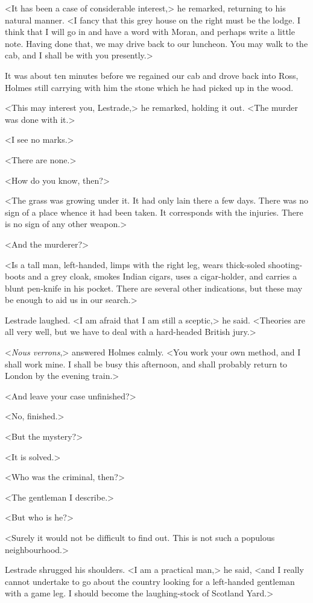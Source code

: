 <It has been a case of considerable interest,> he remarked, returning to his natural manner. <I fancy that this grey house on the right must be the lodge. I think that I will go in and have a word with Moran, and perhaps write a little note. Having done that, we may drive back to our luncheon. You may walk to the cab, and I shall be with you presently.>

It was about ten minutes before we regained our cab and drove back into Ross, Holmes still carrying with him the stone which he had picked up in the wood.

<This may interest you, Lestrade,> he remarked, holding it out. <The murder was done with it.>

<I see no marks.>

<There are none.>

<How do you know, then?>

<The grass was growing under it. It had only lain there a few days. There was no sign of a place whence it had been taken. It corresponds with the injuries. There is no sign of any other weapon.>

<And the murderer?>

<Is a tall man, left-handed, limps with the right leg, wears thick-soled shooting-boots and a grey cloak, smokes Indian cigars, uses a cigar-holder, and carries a blunt pen-knife in his pocket. There are several other indications, but these may be enough to aid us in our search.>

Lestrade laughed. <I am afraid that I am still a sceptic,> he said. <Theories are all very well, but we have to deal with a hard-headed British jury.>

<\textit{Nous verrons},> answered Holmes calmly. <You work your own method, and I shall work mine. I shall be busy this afternoon, and shall probably return to London by the evening train.>

<And leave your case unfinished?>

<No, finished.>

<But the mystery?>

<It is solved.>

<Who was the criminal, then?>

<The gentleman I describe.>

<But who is he?>

<Surely it would not be difficult to find out. This is not such a populous neighbourhood.>

Lestrade shrugged his shoulders. <I am a practical man,> he said, <and I really cannot undertake to go about the country looking for a left-handed gentleman with a game leg. I should become the laughing-stock of Scotland Yard.>

